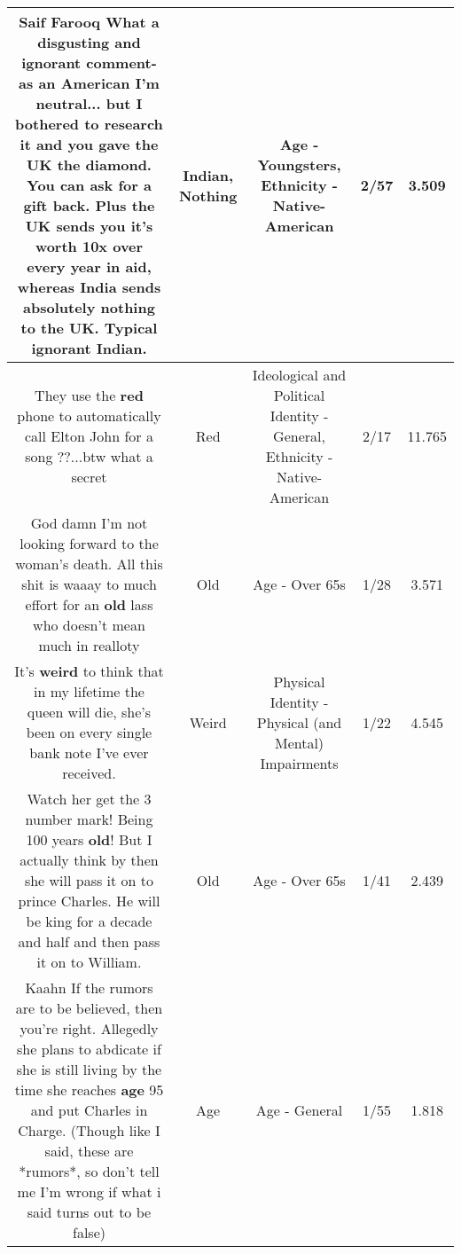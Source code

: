 \documentclass[11pt]{article}
\newlength\mylength
\begin{document}
\begin{center}
\begin{longtable}{|C{.65\mylength}|C{.30\mylength}|C{.12\mylength}|C{.12\mylength}|C{.12\mylength}|}
  \small Saif Farooq What a disgusting and ignorant comment- as an American I'm neutral... but I bothered to research it and you gave the UK the diamond. You can ask for a gift back. Plus the UK sends you it's worth 10x over every year in aid, whereas India sends absolutely \textbf{nothing} to the UK. Typical ignorant \textbf{Indian}.\normalsize   & Indian, Nothing & Age - Youngsters, Ethnicity - Native-American & 2/57 & 3.509 \\  \hline
  \small They use the \textbf{r\textbf{ed}} phone to  automatically call Elton John for a song ??...btw  what a secret\normalsize   & Red &  Ideological and Political Identity - General, Ethnicity - Native-American & 2/17 & 11.765 \\  \hline
  \small God damn I'm not looking forward to the woman's death. All this shit is waaay to much effort for an \textbf{old} lass who doesn't mean much in realloty\normalsize   & Old & Age - Over 65s & 1/28 & 3.571 \\  \hline
  \small It's \textbf{weird} to think that in my lifetime the queen will die, she's been on every single bank note I've ever received.\normalsize   & Weird & Physical Identity - Physical (and Mental) Impairments & 1/22 & 4.545 \\  \hline
  \small Watch her get the 3 number mark! Being 100 years \textbf{old}! But I actually think by then she will pass it on to prince Charles. He will be king for a decade and half  and then pass it on to William.\normalsize   & Old & Age - Over 65s & 1/41 & 2.439 \\  \hline
  \small Kaahn If the rumors are to be believed, then you're right. Allegedly she plans to abdicate if she is still living by the time she reaches \textbf{age} 95 and put Charles in Charge. (Though like I said, these are *rumors*, so don't tell me I'm wrong if what i said turns out to be false)\normalsize   & Age & Age - General & 1/55 & 1.818 \\  \hline

\end{longtable}
\end{center}
\end{document}
